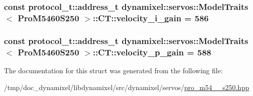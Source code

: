 \subsubsection[{\texorpdfstring{velocity\+\_\+i\+\_\+gain}{velocity_i_gain}}]{\setlength{\rightskip}{0pt plus 5cm}const {\bf protocol\+\_\+t\+::address\+\_\+t} {\bf dynamixel\+::servos\+::\+Model\+Traits}$<$ {\bf Pro\+M5460\+S250} $>$\+::C\+T\+::velocity\+\_\+i\+\_\+gain = 586\hspace{0.3cm}{\ttfamily [static]}}\hypertarget{structdynamixel_1_1servos_1_1_model_traits_3_01_pro_m5460_s250_01_4_1_1_c_t_a624dbdfccd43095e5f07ae740cd47f98}{}\label{structdynamixel_1_1servos_1_1_model_traits_3_01_pro_m5460_s250_01_4_1_1_c_t_a624dbdfccd43095e5f07ae740cd47f98}
\subsubsection[{\texorpdfstring{velocity\+\_\+p\+\_\+gain}{velocity_p_gain}}]{\setlength{\rightskip}{0pt plus 5cm}const {\bf protocol\+\_\+t\+::address\+\_\+t} {\bf dynamixel\+::servos\+::\+Model\+Traits}$<$ {\bf Pro\+M5460\+S250} $>$\+::C\+T\+::velocity\+\_\+p\+\_\+gain = 588\hspace{0.3cm}{\ttfamily [static]}}\hypertarget{structdynamixel_1_1servos_1_1_model_traits_3_01_pro_m5460_s250_01_4_1_1_c_t_ac1b2e2b1e6c3e7b8af39dd171c254394}{}\label{structdynamixel_1_1servos_1_1_model_traits_3_01_pro_m5460_s250_01_4_1_1_c_t_ac1b2e2b1e6c3e7b8af39dd171c254394}


The documentation for this struct was generated from the following file\+:\begin{DoxyCompactItemize}
\item 
/tmp/doc\+\_\+dynamixel/libdynamixel/src/dynamixel/servos/\hyperlink{pro__m54__60__s250_8hpp}{pro\+\_\+m54\+\_\+\_\+s250.\+hpp}\end{DoxyCompactItemize}
